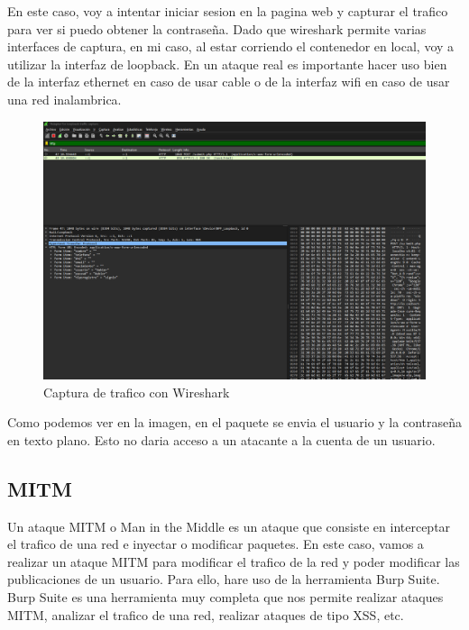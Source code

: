 \documentclass{report}
\begin{document}
                En este caso, voy a intentar iniciar sesion en la pagina web y capturar el trafico para ver si puedo obtener la contraseña.
                Dado que wireshark permite varias interfaces de captura, en mi caso, al estar corriendo el contenedor en local, voy a utilizar la interfaz de loopback.
                En un ataque real es importante hacer uso bien de la interfaz ethernet en caso de usar cable o de la interfaz wifi en caso de usar una red inalambrica.
                \begin{figure}[H]
                    \centering
                    \includegraphics[width=1\textwidth]{./img/vulnerabilidades/2.2/1.1.png}
                    \caption{Captura de trafico con Wireshark}
                \end{figure}
                Como podemos ver en la imagen, en el paquete se envia el usuario y la contraseña en texto plano.
                Esto no daria acceso a un atacante a la cuenta de un usuario.\\
            \clearpage
            \subsection{MITM}
                Un ataque MITM o Man in the Middle es un ataque que consiste en interceptar el trafico de una red e inyectar o modificar paquetes.
                En este caso, vamos a realizar un ataque MITM para modificar el trafico de la red y poder modificar las publicaciones de un usuario.
                Para ello, hare uso de la herramienta Burp Suite.
                Burp Suite es una herramienta muy completa que nos permite realizar ataques MITM, analizar el trafico de una red, realizar ataques de tipo XSS, etc.\\
\end{document}
